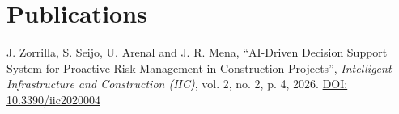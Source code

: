 

\section{Publications}
J. Zorrilla, S. Seijo, U. Arenal and J. R. Mena, ``AI-Driven Decision Support System for Proactive Risk Management in Construction Projects'', \textit{Intelligent Infrastructure and Construction (IIC)}, vol. 2, no. 2, p. 4, 2026. \href{https://doi.org/10.3390/iic2020004}{DOI: 10.3390/iic2020004}
